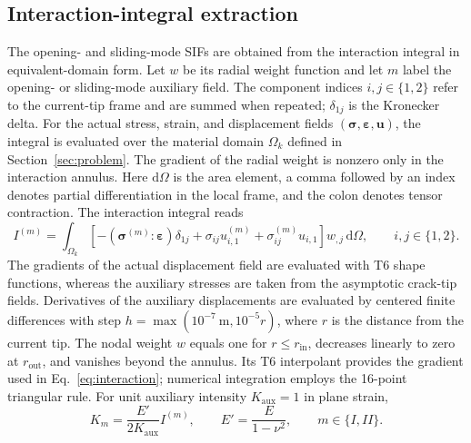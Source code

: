 \documentclass[pdflatex,sn-mathphys-num]{sn-jnl}
\newcommand{\dd}{\mathrm{d}}
\begin{document}
\subsection{Interaction-integral extraction}
The opening- and sliding-mode SIFs are obtained from the
interaction integral in equivalent-domain form. Let $w$ be its
radial weight function and let $m$ label the opening- or sliding-mode
auxiliary field. The component indices $i,j\in\{1,2\}$ refer
to the current-tip frame and are summed when repeated;
$\delta_{1j}$ is the Kronecker delta. For the actual stress,
strain, and displacement fields
$(\bm\sigma,\bm\varepsilon,\bm u)$, the integral is evaluated over
the material domain $\Omega_k$ defined in Section~\ref{sec:problem}.
The gradient of the radial weight is nonzero only in the interaction
annulus. Here $\dd\Omega$ is the area element,
a comma followed by an index denotes partial differentiation in the
local frame, and the colon denotes tensor contraction. The interaction
integral reads
\begin{equation}
 I^{(m)}=\int_{\Omega_k}
 \left[-(\bm\sigma^{(m)}\!:\bm\varepsilon)\delta_{1j}
 +\sigma_{ij}u^{(m)}_{i,1}
 +\sigma^{(m)}_{ij}u_{i,1}\right]w_{,j}\,\dd\Omega,
 \qquad i,j\in\{1,2\}.\label{eq:interaction}
\end{equation}
The gradients of the actual displacement field are evaluated with
T6 shape functions, whereas the auxiliary stresses are taken from
the asymptotic crack-tip fields. Derivatives of the auxiliary
displacements are evaluated by centered finite differences with
step $h=\max(10^{-7}\ \mathrm m,10^{-5}r)$, where $r$ is the
distance from the current tip. The nodal weight $w$ equals one for
$r\leq r_{\mathrm{in}}$, decreases linearly to zero at
$r_{\mathrm{out}}$, and vanishes beyond the annulus.
Its T6 interpolant provides the gradient used in
Eq.~\eqref{eq:interaction}; numerical integration employs the
16-point triangular rule. For unit auxiliary intensity
$K_{\mathrm{aux}}=1$ in plane strain,
\begin{equation}
 K_m=\frac{E'}{2K_{\mathrm{aux}}}I^{(m)},\qquad
 E'=\frac{E}{1-\nu^2},\qquad m\in\{I,II\}.\label{eq:normalization}
\end{equation}
\end{document}
